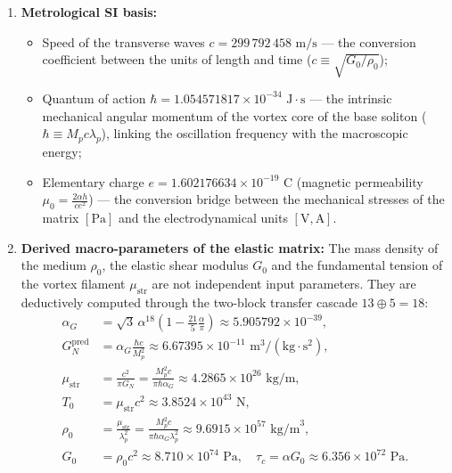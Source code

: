 \documentclass[11pt,a4paper]{article}
\theoremstyle{definition}
\theoremstyle{remark}
\begin{document}
\begin{enumerate}
	\item \textbf{Metrological SI basis:}
\begin{itemize}
	\item Speed of the transverse waves $c = 299\,792\,458\text{ m/s}$ — the conversion coefficient between the units of length and time ($c \equiv \sqrt{G_0 / \rho_0}$);
	\item Quantum of action $\hbar = 1.054571817 \times 10^{-34}\text{ J}\cdot\text{s}$ — the intrinsic mechanical angular momentum of the vortex core of the base soliton ($\hbar \equiv M_p c \lambda_p$), linking the oscillation frequency with the macroscopic energy;
	\item Elementary charge $e = 1.602176634 \times 10^{-19}\text{ C}$ (magnetic permeability $\mu_0 = \frac{2\alpha h}{c e^2}$) — the conversion bridge between the mechanical stresses of the matrix $[\text{Pa}]$ and the electrodynamical units $[\text{V}, \text{A}]$.
\end{itemize}
\item \textbf{Derived macro-parameters of the elastic matrix:}
	The mass density of the medium $\rho_0$, the elastic shear modulus $G_0$ and the fundamental tension of the vortex filament $\mu_{\mathrm{str}}$ are not independent input parameters. They are deductively computed through the two-block transfer cascade $13 \oplus 5 = 18$:
\begin{align}
	\alpha_G &= \sqrt{3}\,\alpha^{18}\left(1 - \frac{21}{5}\frac{\alpha}{\pi}\right) \approx 5.905792 \times 10^{-39}, \label{eq:alpha_G_master_def} \\
	G_N^{\mathrm{pred}} &= \alpha_G \frac{\hbar c}{M_p^2} \approx 6.67395 \times 10^{-11}\text{ m}^3/(\text{kg}\cdot\text{s}^2), \label{eq:G_N_master_def} \\
\mu_{\mathrm{str}} &= \frac{c^2}{\pi G_N} = \frac{M_p^2 c}{\pi \hbar \alpha_G} \approx 4.2865 \times 10^{26}\text{ kg/m}, \label{eq:mu_str_master_def} \\
T_0 &= \mu_{\mathrm{str}} c^2 \approx 3.8524 \times 10^{43}\text{ N}, \label{eq:T_0_master_def} \\
\rho_0 &= \frac{\mu_{\mathrm{str}}}{\lambda_p^2} = \frac{M_p^2 c}{\pi \hbar \alpha_G \lambda_p^2} \approx 9.6915 \times 10^{57}\text{ kg/m}^3, \label{eq:rho_0_master_def} \\
G_0 &= \rho_0 c^2 \approx 8.710 \times 10^{74}\text{ Pa}, \quad \tau_c = \alpha G_0 \approx 6.356 \times 10^{72}\text{ Pa}. \label{eq:G_0_master_def}
\end{align}
\end{enumerate}
\end{document}
